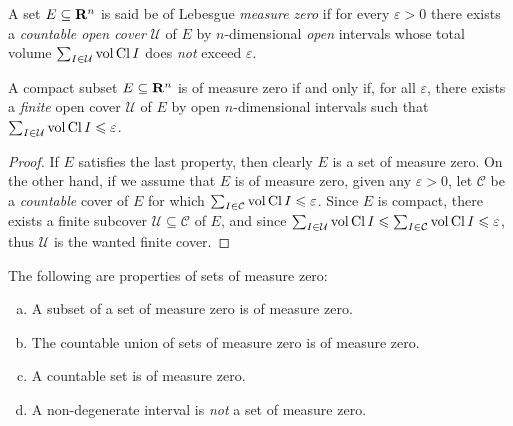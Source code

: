 \begin{definition}
\label{def:measure-zero-set}
A set \(E \subseteq \mathbf{R}^n\) is said be of Lebesgue \emph{measure zero} if for
every \(\varepsilon > 0\) there exists a \emph{countable open cover} \(\mathcal
U\) of \(E\) by \(n\)-dimensional \emph{open} intervals whose total volume
\(\sum_{I \in \mathcal U} \operatorname{vol} \operatorname{Cl} I\) does \emph{not} exceed
\(\varepsilon\).
\end{definition}

\begin{corollary}
\label{cor:compact-finite-cover-infinitesimal-volume}
A compact subset \(E \subseteq \mathbf{R}^n\) is of measure zero if and only if, for all
\(\varepsilon\), there exists a \emph{finite} open cover \(\mathcal U\) of \(E\)
by open \(n\)-dimensional intervals such that \(\sum_{I \in \mathcal U} \operatorname{vol}
\operatorname{Cl} I \leqslant \varepsilon\).
\end{corollary}

\begin{proof}
If \(E\) satisfies the last property, then clearly \(E\) is a set of measure
zero. On the other hand, if we assume that \(E\) is of measure zero, given any
\(\varepsilon > 0\), let \(\mathcal C\) be a \emph{countable} cover of \(E\) for
which \(\sum_{I \in \mathcal C} \operatorname{vol} \operatorname{Cl} I \leqslant \varepsilon\). Since
\(E\) is compact, there exists a finite subcover \(\mathcal U \subseteq \mathcal
C\) of \(E\), and since \(\sum_{I \in \mathcal U} \operatorname{vol} \operatorname{Cl} I \leqslant \sum_{I
\in \mathcal C} \operatorname{vol} \operatorname{Cl} I \leqslant \varepsilon\), thus \(\mathcal U\) is the
wanted finite cover.
\end{proof}

\begin{lemma}
\label{lem:measure-zero-properties}
The following are properties of sets of measure zero:
\begin{enumerate}[(a)]\setlength\itemsep{0em}
\item A subset of a set of measure zero is of measure zero.
\item The countable union of sets of measure zero is of measure zero.
\item A countable set is of measure zero.
\item A non-degenerate interval is \emph{not} a set of measure zero.
\end{enumerate}
\end{lemma}

